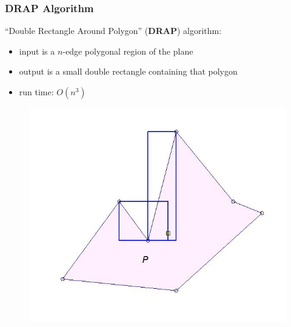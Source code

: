 \documentclass[compress]{beamer}
\begin{document}
\begin{frame} \frametitle{DRAP Algorithm}
``Double Rectangle Around Polygon'' (\textbf{DRAP}) algorithm:\\
\begin{itemize}
     \item input is a $n$-edge polygonal region of the plane
    \item output is a small double rectangle containing that polygon
    \item run time: $O(n^3)$
\end{itemize}

    \begin{figure}
    \includegraphics[scale=0.3]{drap2.jpg}
    \end{figure}


\transboxout
\end{frame}
\end{document}
